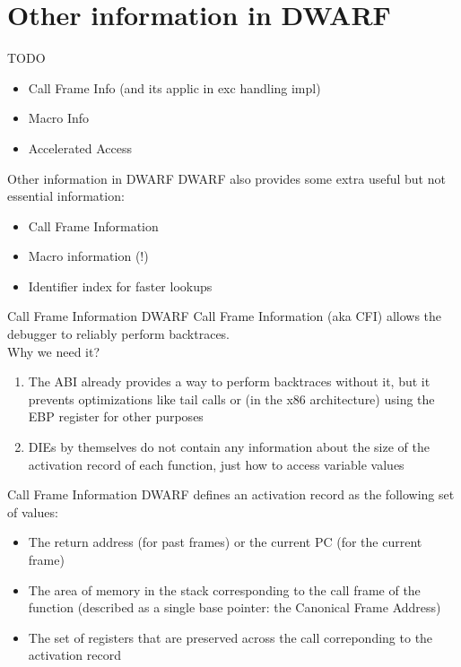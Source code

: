 
\section{Other information in DWARF}


\begin{frame}{TODO}
\begin{itemize}
\item Call Frame Info (and its applic in exc handling impl)
\item Macro Info
\item Accelerated Access
\end{itemize}
\end{frame}


\begin{frame}{Other information in DWARF}
DWARF also provides some extra useful but not essential information:
\begin{itemize}
\item Call Frame Information
\item Macro information (!)
\item Identifier index for faster lookups
\end{itemize}
\end{frame}


\begin{frame}{Call Frame Information}
DWARF Call Frame Information (aka CFI) allows the debugger to reliably perform
backtraces.\\
\medskip
Why we need it?\\
\medskip
\begin{enumerate}
\item The ABI already provides a way to perform backtraces without it, but it
	prevents optimizations like tail calls or (in the x86 architecture) using the
	EBP register for other purposes
\item DIEs by themselves do not contain any information about the size
	of the activation record of each function, just how to access variable values
\end{enumerate}
\end{frame}


\begin{frame}{Call Frame Information}
DWARF defines an activation record as the following set of values:\\
\medskip
\begin{itemize}
\item The return address (for past frames) or the current PC (for the current frame)
\item The area of memory in the stack corresponding to the call frame of the function
	(described as a single base pointer: the Canonical Frame Address)
\item The set of registers that are preserved across the call correponding to the
	activation record
\end{itemize}
\end{frame}


